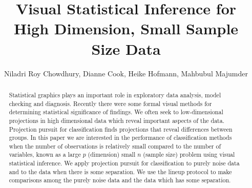 \documentclass[12]{article}
\begin{document}



\title{Visual Statistical Inference for High Dimension, Small Sample Size Data}\label{ch:largepsmalln}
\vspace{-0.8cm}
\author{Niladri Roy Chowdhury, Dianne Cook, Heike Hofmann, Mahbubul Majumder}



\maketitle

\begin{abstract}
Statistical graphics plays an important role in exploratory data analysis, model checking and diagnosis. Recently there were some formal visual methods for determining statistical significance of findings. We often seek to low-dimensional projections in high dimensional data which reveal important aspects of the data. Projection pursuit for classification finds projections that reveal differences between groups. In this paper we are interested in the performance of classification methods when the number of observations is relatively small compared to the number of variables, known as a large $p$ (dimension) small $n$ (sample size) problem using visual statistical inference. We apply projection pursuit for classification to purely noise data and to the data when there is some separation. We use the lineup protocol \cite{buja:2009} to make comparisons among the purely noise data and the data which has some separation.

\end{abstract}
\end{document}
